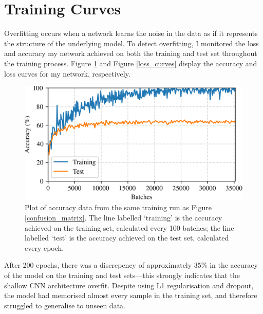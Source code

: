 \documentclass[conference]{IEEEtran}
\begin{document}
\section{Training Curves}

Overfitting occurs when a network learns the noise in the data as if it represents the structure of the underlying model.
To detect overfitting, I monitored the loss and accuracy my network achieved on both the training and test set throughout the training process.
Figure \ref{accuracy_curves} and Figure \ref{loss_curves} display the accuracy and loss curves for my network, respectively.

\begin{figure}[htbp]
    \centerline{\includegraphics[width=\columnwidth]{accuracy.png}}
    \caption{
        Plot of accuracy data from the same training run as Figure \ref{confusion_matrix}.
        The line labelled `training' is the accuracy achieved on the training set, calculated every 100 batches; the line labelled `test' is the accuracy achieved on the test set, calculated every epoch.}
    \label{accuracy_curves}
\end{figure}

After 200 epochs, there was a discrepency of approximately 35\% in the accuracy of the model on the training and test sets---this strongly indicates that the shallow CNN architecture overfit.
Despite using L1 regularisation and dropout, the model had memorised almost every sample in the training set, and therefore struggled to generalise to unseen data.
\end{document}
